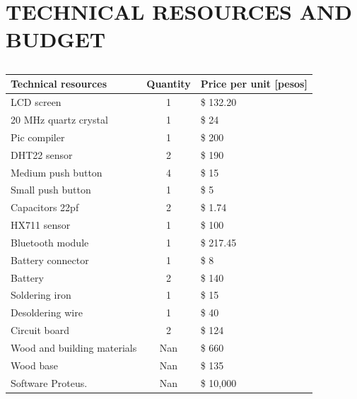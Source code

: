 \documentclass[12pt]{report}
\begin{document}
	\pagebreak
	\chapter{TECHNICAL RESOURCES AND BUDGET}
	
	\begin{table}[h!]
		\centering
		\caption[Technical Resources and Budget]{}
		\begin{tabular}{||m{10cm}| c | l ||}
			\hline
			\textbf{Technical resources}    & \textbf{Quantity} & \textbf{Price per unit [pesos]} \\ [0.5ex] \hline
			LCD screen                      & 1     & \$ 132.20 \\ [.5ex] \hline
			20 MHz quartz crystal           & 1     & \$ 24 \\ [.5ex] \hline
			Pic compiler                    & 1     & \$ 200 \\ [0.5ex] \hline
			DHT22 sensor                    & 2     & \$ 190 \\ [0.5ex] \hline
			Medium push button              & 4     & \$ 15 \\ [0.5ex] \hline
			Small push button               & 1     & \$ 5 \\ [0.5ex] \hline
			Capacitors 22pf                 & 2     & \$ 1.74 \\ [0.5ex] \hline
			HX711 sensor                    & 1     & \$ 100 \\ [0.5ex] \hline
			Bluetooth module                & 1     & \$ 217.45 \\ [0.5ex] \hline
			Battery connector               & 1     & \$ 8 \\ [0.5ex] \hline
			Battery                         & 2     & \$ 140 \\ [0.5ex] \hline
			Soldering iron                  & 1     & \$ 15 \\ [0.5ex] \hline
			Desoldering wire                & 1     & \$ 40 \\ [0.5ex] \hline
			Circuit board                   & 2     & \$ 124 \\ [0.5ex] \hline
			Wood and building materials     & Nan   & \$ 660 \\ [0.5ex] \hline
			Wood base                       & Nan   & \$ 135 \\ [0.5ex] \hline
			Software Proteus.               & Nan   & \$ 10,000 \\ [0.5ex] \hline
		\end{tabular}
	\end{table}
	
\end{document}

